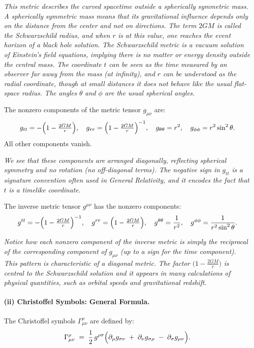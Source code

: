 \documentclass{article}
\begin{document}
\emph{This metric describes the curved spacetime outside a spherically symmetric mass. A spherically symmetric mass means that its gravitational influence depends only on the distance from the center and not on directions. The term \(2GM\) is called the Schwarzschild radius, and when \(r\) is at this value, one reaches the event horizon of a black hole solution. The Schwarzschild metric is a vacuum solution of Einstein’s field equations, implying there is no matter or energy density outside the central mass. The coordinate \(t\) can be seen as the time measured by an observer far away from the mass (at infinity), and \(r\) can be understood as the radial coordinate, though at small distances it does not behave like the usual flat-space radius. The angles \(\theta\) and \(\phi\) are the usual spherical angles.}

\noindent
The nonzero components of the metric tensor \(g_{\mu\nu}\) are:
\[
g_{tt} = -\Bigl(1 - \tfrac{2GM}{r}\Bigr),
\quad
g_{rr} = \Bigl(1 - \tfrac{2GM}{r}\Bigr)^{-1},
\quad
g_{\theta\theta} = r^2,
\quad
g_{\phi\phi} = r^2 \sin^2\theta.
\]
All other components vanish.

\emph{We see that these components are arranged diagonally, reflecting spherical symmetry and no rotation (no off-diagonal terms). The negative sign in \(g_{tt}\) is a signature convention often used in General Relativity, and it encodes the fact that \(t\) is a timelike coordinate.}

\smallskip

\noindent
The inverse metric tensor \(g^{\mu\nu}\) has the nonzero components:
\[
g^{tt}
=
-\Bigl(1 - \tfrac{2GM}{r}\Bigr)^{-1},
\quad
g^{rr}
=
\Bigl(1 - \tfrac{2GM}{r}\Bigr),
\quad
g^{\theta\theta}
=
\frac{1}{r^2},
\quad
g^{\phi\phi}
=
\frac{1}{r^2 \sin^2\theta}.
\]

\emph{Notice how each nonzero component of the inverse metric is simply the reciprocal of the corresponding component of \(g_{\mu\nu}\) (up to a sign for the time component). This pattern is characteristic of a diagonal metric. The factor \(\bigl(1 - \frac{2GM}{r}\bigr)\) is central to the Schwarzschild solution and it appears in many calculations of physical quantities, such as orbital speeds and gravitational redshift.}

\paragraph{(ii) Christoffel Symbols: General Formula.}
The Christoffel symbols \(\Gamma^\rho_{\mu\nu}\) are defined by:
\[
\Gamma^\rho_{\mu \nu}
\;=\;
\frac{1}{2} \, g^{\rho \sigma}
\Bigl(
\partial_\mu g_{\sigma\nu}
\;+\;
\partial_\nu g_{\sigma\mu}
\;-\;
\partial_\sigma g_{\mu\nu}
\Bigr).
\]
\end{document}

